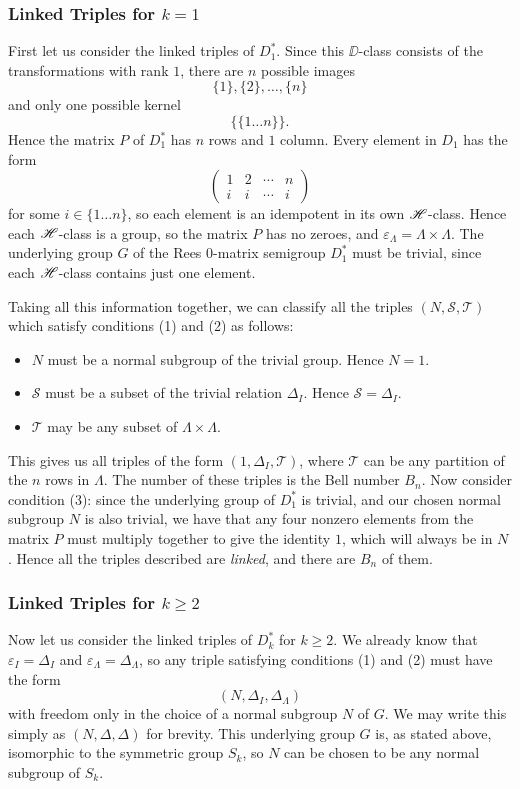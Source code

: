 \subsubsection{Linked Triples for $k = 1$}
\label{sec:k1}
First let us consider the linked triples of $D_1^*$.  Since this $\DD$-class
consists of the transformations with rank $1$, there are $n$ possible images
$$\{1\}, \{2\}, \dots, \{n\}$$ and only one possible kernel
$$\big\{\{1 \dots n\}\big\}.$$
Hence the matrix $P$ of $D_1^*$ has $n$ rows and $1$ column.  Every element in
$D_1$ has the form
$$\begin{pmatrix}
  1 & 2 & \cdots & n \\
  i & i & \cdots & i
\end{pmatrix}$$ for some $i \in \{1 \dots n\}$, so each element is an idempotent
in its own $\mathrel{\mathscr{H}}$-class.  Hence each $\mathrel{\mathscr{H}}$-class is a group, so the matrix $P$ has no
zeroes, and $\varepsilon_\Lambda = \Lambda \times \Lambda$.  The underlying
group $G$ of the Rees 0-matrix semigroup $D_1^*$ must be trivial, since each
$\mathrel{\mathscr{H}}$-class contains just one element.

Taking all this information together, we can classify all the triples $(N,
\mathcal{S}, \mathcal{T})$ which satisfy conditions (1) and (2) as follows:
\begin{itemize}
\item $N$ must be a normal subgroup of the trivial group.  Hence $N = 1$.
\item $\mathcal{S}$ must be a subset of the trivial relation $\Delta_I$.  Hence
  $\mathcal{S} = \Delta_I$.
\item $\mathcal{T}$ may be any subset of $\Lambda \times \Lambda$.
\end{itemize}
This gives us all triples of the form $(1,\Delta_I,\mathcal{T})$, where
$\mathcal{T}$ can be any partition of the $n$ rows in $\Lambda$.  The number of
these triples is the Bell number $B_n$.  Now consider condition (3): since the
underlying group of $D_1^*$ is trivial, and our chosen normal subgroup $N$ is
also trivial, we have that any four nonzero elements from the matrix $P$ must
multiply together to give the identity $1$, which will always be in $N$.  Hence all the
triples described are \textit{linked}, and there are $B_n$ of them.

\subsubsection{Linked Triples for $k \geq 2$}
\label{sec:k2}
Now let us consider the linked triples of $D_k^*$ for $k \geq 2$.  We already
know that $\varepsilon_I = \Delta_I$ and $\varepsilon_\Lambda = \Delta_\Lambda$,
so any triple satisfying conditions (1) and (2) must have the form
$$(N, \Delta_I, \Delta_\Lambda)$$
with freedom only in the choice of a normal subgroup $N$ of $G$.  We may write
this simply as $(N, \Delta, \Delta)$ for brevity.  This
underlying group $G$ is, as stated above, isomorphic to the symmetric group
$S_k$, so $N$ can be chosen to be any normal subgroup of $S_k$.

